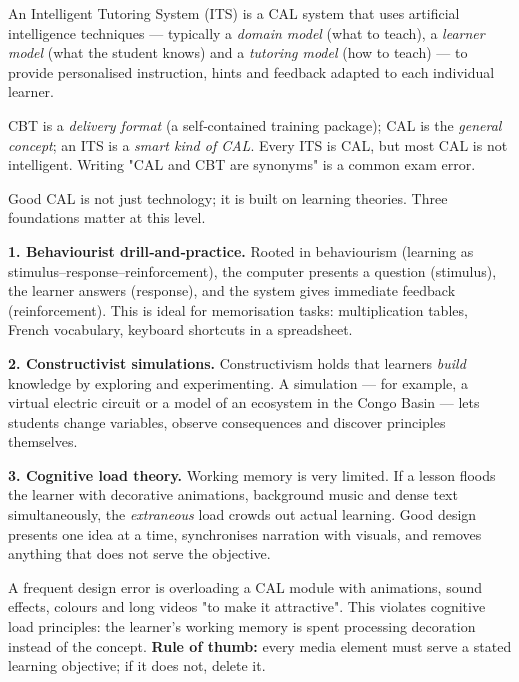 \documentclass[11pt]{article}
\newcommand{\cle}[1]{{\popxbold\color{popdark}#1}}
\newcounter{popsec}
\newcounter{popsub}
\newcommand{\courssub}[1]{%
  \stepcounter{popsub}%
  \par\vspace{9pt}\noindent{\popxbold\fontsize{11.5}{13}\selectfont\color{popink}{\color{poporange}\thepopsec.\thepopsub}\hspace{6pt}#1}\par\nopagebreak\vspace{4pt}
}
\begin{document}
\begin{definition}
An \cle{Intelligent Tutoring System} (ITS) is a CAL system that uses \cle{artificial intelligence} techniques — typically a \emph{domain model} (what to teach), a \emph{learner model} (what the student knows) and a \emph{tutoring model} (how to teach) — to provide personalised instruction, hints and feedback adapted to each individual learner.
\end{definition}

\begin{attention}
CBT is a \emph{delivery format} (a self‑contained training package); CAL is the \emph{general concept}; an ITS is a \emph{smart kind of CAL}. Every ITS is CAL, but most CAL is not intelligent. Writing "CAL and CBT are synonyms" is a common exam error.
\end{attention}

\courssub{Pedagogical Foundations of CAL}

Good CAL is not just technology; it is built on \cle{learning theories}. Three foundations matter at this level.

\textbf{1. Behaviourist drill‑and‑practice.} Rooted in behaviourism (learning as stimulus–response–reinforcement), the computer presents a question (stimulus), the learner answers (response), and the system gives immediate feedback (reinforcement). This is ideal for memorisation tasks: multiplication tables, French vocabulary, keyboard shortcuts in a spreadsheet.

\textbf{2. Constructivist simulations.} Constructivism holds that learners \emph{build} knowledge by exploring and experimenting. A simulation — for example, a virtual electric circuit or a model of an ecosystem in the Congo Basin — lets students change variables, observe consequences and discover principles themselves.

\textbf{3. Cognitive load theory.} Working memory is very limited. If a lesson floods the learner with decorative animations, background music and dense text simultaneously, the \emph{extraneous} load crowds out actual learning. Good design presents one idea at a time, synchronises narration with visuals, and removes anything that does not serve the objective.

\begin{attention}
A frequent design error is overloading a CAL module with animations, sound effects, colours and long videos "to make it attractive". This violates \cle{cognitive load} principles: the learner's working memory is spent processing decoration instead of the concept. \textbf{Rule of thumb:} every media element must serve a stated learning objective; if it does not, delete it.
\end{attention}
\end{document}

